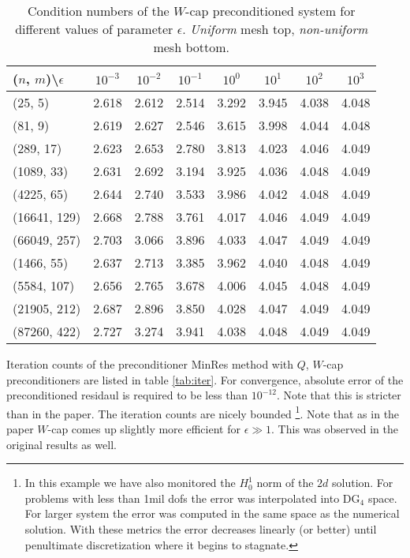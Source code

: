 \documentclass[10pt, a4paper]{article}
\begin{document}
\begin{table}[hb]
  \caption{Condition numbers of the $W$-cap preconditioned system for different values of parameter 
$\epsilon$. \textit{Uniform} mesh top, \textit{non-uniform} mesh bottom.
}
\label{tab:con_Wcap_unif}
\footnotesize{
\begin{tabular}{l|ccccccc}
\hline
($n$, $m$)\textbackslash $\epsilon$ & $10^{-3}$ & $10^{-2}$ & $10^{-1}$ & $10^{0}$ & $10^{1}$ & $10^{2}$ & $10^{3}$\\
\hline
(25, 5) & 2.618 & 2.612 & 2.514 & 3.292 & 3.945 & 4.038 & 4.048\\
(81, 9) & 2.619 & 2.627 & 2.546 & 3.615 & 3.998 & 4.044 & 4.048\\
(289, 17) & 2.623 & 2.653 & 2.780 & 3.813 & 4.023 & 4.046 & 4.049\\
(1089, 33) & 2.631 & 2.692 & 3.194 & 3.925 & 4.036 & 4.048 & 4.049\\
(4225, 65) & 2.644 & 2.740 & 3.533 & 3.986 & 4.042 & 4.048 & 4.049\\
(16641, 129) & 2.668 & 2.788 & 3.761 & 4.017 & 4.046 & 4.049 & 4.049\\
(66049, 257) & 2.703 & 3.066 & 3.896 & 4.033 & 4.047 & 4.049 & 4.049\\
\hline
\hline
(1466, 55) & 2.637 & 2.713 & 3.385 & 3.962 & 4.040 & 4.048 & 4.049\\
(5584, 107) & 2.656 & 2.765 & 3.678 & 4.006 & 4.045 & 4.048 & 4.049\\
(21905, 212) & 2.687 & 2.896 & 3.850 & 4.028 & 4.047 & 4.049 & 4.049\\
(87260, 422) & 2.727 & 3.274 & 3.941 & 4.038 & 4.048 & 4.049 & 4.049\\
\hline
\end{tabular}
}
\end{table}

Iteration counts of the preconditioner MinRes method with $Q$, $W$-cap preconditioners are listed in table \ref{tab:iter}. For 
convergence, absolute error of the preconditioned residaul is required to be less than $10^{-12}$. Note that this is stricter 
than in the paper. The iteration counts are nicely bounded
\footnote{In this example we have also monitored the $H^1_0$ norm of the $2d$ solution. For problems with less than 1mil dofs the
error was interpolated into DG$_4$ space. For larger system the error was computed in the same space as the numerical solution. 
With these metrics the error decreases linearly (or better) until penultimate discretization where it begins to stagnate.}. Note
that as in the paper $W$-cap comes up slightly more efficient for $\epsilon\gg 1$. This was observed in the original results as well.
\end{document}

